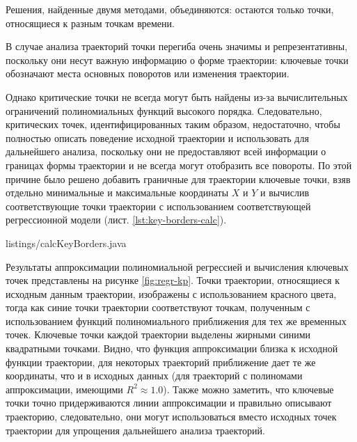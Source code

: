 Решения, найденные двумя методами, объединяются: остаются только точки, относящиеся к разным точкам времени.

В случае анализа траекторий точки перегиба очень значимы и репрезентативны, поскольку они несут важную информацию о форме траектории: ключевые точки обозначают места основных поворотов или изменения траектории.

Однако критические точки не всегда могут быть найдены из-за вычислительных ограничений полиномиальных функций высокого порядка. Следовательно, критических точек, идентифицированных таким образом, недостаточно, чтобы полностью описать поведение исходной траектории и использовать для дальнейшего анализа, поскольку они не предоставляют всей информации о границах формы траектории и не всегда могут отобразить все повороты. По этой причине было решено добавить граничные для траектории ключевые точки, взяв отдельно минимальные и максимальные координаты $X$ и $Y$ и вычислив соответствующие точки траектории с использованием соответствующей регрессионной модели (лист. \ref{lst:key-borders-calc}).

 {listings/calcKeyBorders.java}

Результаты аппроксимации полиномиальной регрессией и вычисления ключевых точек представлены на рисунке \ref{fig:regr-kp}. Точки траектории, относящиеся к исходным данным траектории, изображены с использованием красного цвета, тогда как синие точки траектории соответствуют точкам, полученным с использованием функций полиномиального приближения для тех же временных точек. Ключевые точки каждой траектории выделены жирными синими квадратными точками. Видно, что функция аппроксимации близка к исходной функции траектории, для некоторых траекторий приближение дает те же координаты, что и в исходных данных (для траекторий с полиномами аппроксимации, имеющими $R^2 \approx 1.0$). Также можно заметить, что ключевые точки точно придерживаются линии аппроксимации и правильно описывают траекторию, следовательно, они могут использоваться вместо исходных точек траектории для упрощения дальнейшего анализа траекторий.

